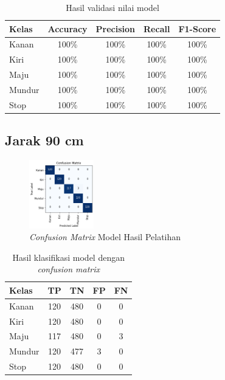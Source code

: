 \begin{longtable}{|l|c|c|c|c|}
  \caption{Hasil validasi nilai model}
  \label{tb:vs_model4} \\
  \hline
  \rowcolor[HTML]{C0C0C0} 
  \textbf{Kelas} & \textbf{Accuracy} & \textbf{Precision} & \textbf{Recall} & \textbf{F1-Score} \\ \hline
  Kanan    & 100\%            & 100\%             & 100\%           & 100\%            \\ \hline
  Kiri     & 100\%          & 100\%           & 100\%           & 100\%           \\ \hline
  Maju      & 100\%          & 100\%           & 100\%          & 100\%          \\ \hline
  Mundur     & 100\%            & 100\%             & 100\%           & 100\%            \\ \hline
  Stop  & 100\%            & 100\%             & 100\%           & 100\%            \\ \hline
\end{longtable}

\subsection{Jarak 90 cm}

\begin{figure} [ht] \centering
  \includegraphics[width=0.25\textwidth]{gambar/bab4/model8 (90cm)/matrix.png}
  \caption{\emph{Confusion Matrix} Model Hasil Pelatihan}
  \label{fig:matrix5}
\end{figure}

\begin{longtable}{|l|c|c|c|c|}
  \caption{Hasil klasifikasi model dengan \emph{confusion matrix}}
  \label{tb:cm_model5} \\
  \hline
  \rowcolor[HTML]{C0C0C0} 
  \textbf{Kelas} & \textbf{TP} & \textbf{TN} & \textbf{FP} & \textbf{FN} \\ \hline
  Kanan    & 120          & 480         & 0           & 0           \\ \hline
  Kiri      & 120          & 480         & 0           & 0           \\ \hline
  Maju      & 117          & 480         & 0           & 3           \\ \hline
  Mundur     & 120          & 477         & 3           & 0           \\ \hline
  Stop  & 120          & 480         & 0           & 0           \\ \hline
\end{longtable}

